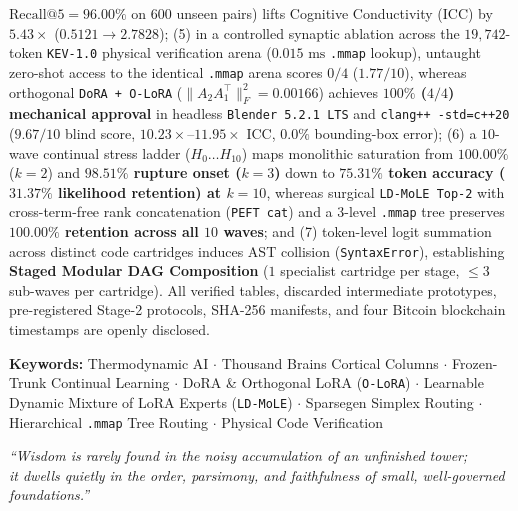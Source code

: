 \documentclass[10pt,a4paper]{article}
\begin{document}
{{$\text{Recall@5}=96.00\%$ on $600$ unseen pairs) lifts Cognitive Conductivity ($\mathrm{ICC}$) by \textbf{$5.43\times$} ($0.5121 \to 2.7828$); (5) in a controlled synaptic ablation across the $19,742$-token \texttt{KEV-1.0} physical verification arena ($0.015\text{ ms}$ \texttt{.mmap} lookup), untaught zero-shot access to the identical \texttt{.mmap} arena scores $0/4$ ($1.77/10$), whereas orthogonal \texttt{DoRA + O-LoRA} ($\|A_2 A_1^\top\|_F^2 = 0.00166$) achieves \textbf{$100\%$ ($4/4$) mechanical approval} in headless \texttt{Blender 5.2.1 LTS} and \texttt{clang++ -std=c++20} ($9.67/10$ blind score, $10.23\times\text{--}11.95\times$ $\mathrm{ICC}$, $0.0\%$ bounding-box error); (6) a $10$-wave continual stress ladder ($H_0\dots H_{10}$) maps monolithic saturation from $100.00\%$ ($k=2$) and \textbf{$98.51\%$ rupture onset ($k=3$)} down to \textbf{$75.31\%$ token accuracy ($31.37\%$ likelihood retention) at $k=10$}, whereas surgical \texttt{LD-MoLE Top-2} with cross-term-free rank concatenation (\texttt{PEFT cat}) and a 3-level \texttt{.mmap} tree preserves \textbf{$100.00\%$ retention across all $10$ waves}; and (7) token-level logit summation across distinct code cartridges induces AST collision (\texttt{SyntaxError}), establishing \textbf{Staged Modular DAG Composition} ($1$ specialist cartridge per stage, $\le 3$ sub-waves per cartridge). All verified tables, discarded intermediate prototypes, pre-registered Stage-2 protocols, SHA-256 manifests, and four Bitcoin blockchain timestamps are openly disclosed.\vspace{3pt}
  }%
}

\vspace{2pt}
{\footnotesize\textbf{\color{primary}Keywords:} Thermodynamic AI $\cdot$ Thousand Brains Cortical Columns $\cdot$ Frozen-Trunk Continual Learning $\cdot$ DoRA \& Orthogonal LoRA (\texttt{O-LoRA}) $\cdot$ Learnable Dynamic Mixture of LoRA Experts (\texttt{LD-MoLE}) $\cdot$ Sparsegen Simplex Routing $\cdot$ Hierarchical \texttt{.mmap} Tree Routing $\cdot$ Physical Code Verification}

\begin{flushright}
{\footnotesize\itshape\color{slate} ``Wisdom is rarely found in the noisy accumulation of an unfinished tower;\\it dwells quietly in the order, parsimony, and faithfulness of small, well-governed foundations.''}
\end{flushright}

\newpage
\tableofcontents
\newpage
\end{document}
